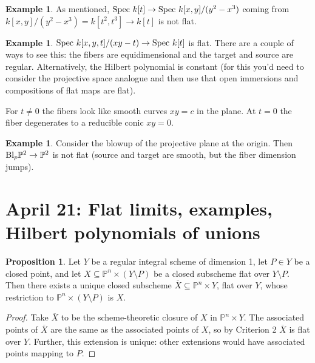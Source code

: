 \documentclass[10pt,reqno]{amsart}
\theoremstyle{definition}
\newtheorem{example}[theorem]{Example}
\newtheorem{proposition}[theorem]{Proposition}
\theoremstyle{remark}
\numberwithin{equation}{section}
\numberwithin{theorem}{section}
\newcommand{\spec}{\textup{Spec }}
\newcommand{\Bl}{\textup{Bl}}
\newcommand{\PP}{{\mathbb P}}
\begin{document}
\begin{example} As mentioned, $\spec k[t] \to \spec k[x,y]/(y^2-x^3)$ coming from $k[x,y]/(y^2-x^3) = k[t^2,t^3] \to k[t]$ is not flat. 
\end{example}

\begin{example} $\spec k[x,y,t]/(xy-t) \to \spec k[t]$ is flat. There are a couple of ways to see this: the fibers are equidimensional and the target and source are regular. Alternatively, the Hilbert polynomial is constant (for this you'd need to consider the projective space analogue and then use that open immersions and compositions of flat maps are flat). 

For $t\ne 0$ the fibers look like smooth curves $xy = c$ in the plane. At $t=0$ the fiber degenerates to a reducible conic $xy = 0$.
\end{example} 

\begin{example} Consider the blowup of the projective plane at the origin. Then $\Bl_p \PP^2 \to \PP^2$ is not flat (source and target are smooth, but the fiber dimension jumps).
\end{example}

\section{April 21: Flat limits, examples, Hilbert polynomials of unions}
\begin{proposition} Let $Y$ be a regular integral scheme of dimension 1, let $P \in Y$ be a closed point, and let $X \subseteq \PP^n \times (Y \setminus P)$ be a closed subscheme flat over $Y \setminus P$. Then there exists a unique closed subscheme $\overline{X} \subseteq \PP^n \times Y$, flat over $Y$, whose restriction to $\PP^n \times (Y \setminus P)$ is $X$.
\end{proposition}
\begin{proof}
Take $\overline{X}$ to be the scheme-theoretic closure of $X$ in $\PP^n \times Y$. The associated points of $\overline{X}$ are the same as the associated points of $X$, so by Criterion 2 $\overline{X}$ is flat over $Y$. Further, this extension is unique: other extensions would have associated points mapping to $P$.
\end{proof}
\end{document}
